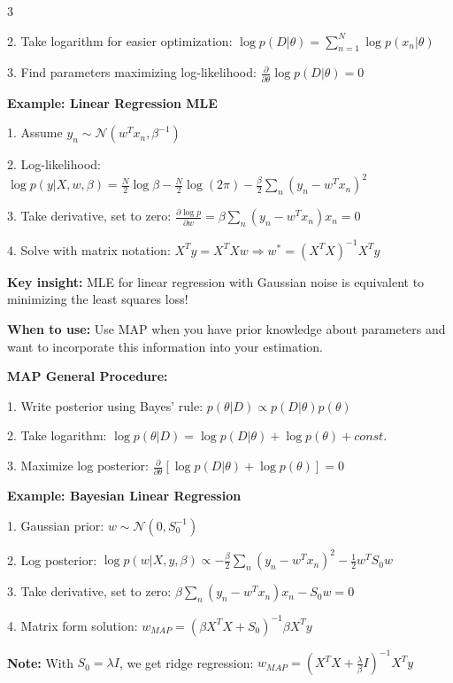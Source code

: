\documentclass[10pt,landscape]{article}
\begin{document}
\begin{multicols}{3}
\begin{tcolorbox}[breakable, title=1.2 Maximum Likelihood Estimation, colback=regression,boxsep=1pt,left=1pt,right=1pt,top=1pt,bottom=1pt]
2. Take logarithm for easier optimization:
$\log p(D|\theta) = \sum_{n=1}^{N} \log p(x_n|\theta)$

3. Find parameters maximizing log-likelihood:
$\frac{\partial}{\partial \theta}\log p(D|\theta) = 0$

\textbf{Example: Linear Regression MLE}

1. Assume $y_n \sim \mathcal{N}(w^T x_n, \beta^{-1})$

2. Log-likelihood:
$\log p(y|X, w, \beta) = \frac{N}{2}\log\beta - \frac{N}{2}\log(2\pi) - \frac{\beta}{2}\sum_{n}(y_n - w^Tx_n)^2$

3. Take derivative, set to zero:
$\frac{\partial \log p}{\partial w} = \beta \sum_{n}(y_n - w^Tx_n)x_n = 0$

4. Solve with matrix notation:
$X^Ty = X^TXw \Rightarrow w^* = (X^TX)^{-1}X^Ty$

\textbf{Key insight:} MLE for linear regression with Gaussian noise is equivalent to minimizing the least squares loss!
\end{tcolorbox}

\begin{tcolorbox}[breakable, title=1.3 Maximum A Posteriori Estimation, colback=regression,boxsep=1pt,left=1pt,right=1pt,top=1pt,bottom=1pt]
\textbf{When to use:} Use MAP when you have prior knowledge about parameters and want to incorporate this information into your estimation.

\textbf{MAP General Procedure:}

1. Write posterior using Bayes' rule:
$p(\theta|D) \propto p(D|\theta)p(\theta)$

2. Take logarithm:
$\log p(\theta|D) = \log p(D|\theta) + \log p(\theta) + const.$

3. Maximize log posterior:
$\frac{\partial}{\partial \theta}[\log p(D|\theta) + \log p(\theta)] = 0$

\textbf{Example: Bayesian Linear Regression}

1. Gaussian prior: $w \sim \mathcal{N}(0, S_0^{-1})$

2. Log posterior:
$\log p(w|X,y,\beta) \propto -\frac{\beta}{2}\sum_n(y_n - w^Tx_n)^2 - \frac{1}{2}w^TS_0w$

3. Take derivative, set to zero:
$\beta\sum_n(y_n - w^Tx_n)x_n - S_0w = 0$

4. Matrix form solution:
$w_{MAP} = (\beta X^TX + S_0)^{-1}\beta X^Ty$

\textbf{Note:} With $S_0 = \lambda I$, we get ridge regression: 
$w_{MAP} = (X^TX + \frac{\lambda}{\beta}I)^{-1}X^Ty$
\end{tcolorbox}


\end{multicols}
\end{document}
